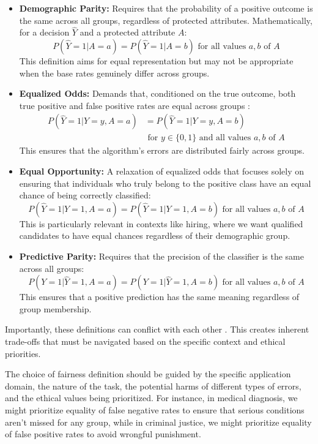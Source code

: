 \documentclass[12pt,a4paper,openright,twoside]{book}
\begin{document}
\begin{itemize}
    \item \textbf{Demographic Parity:} Requires that the probability of a positive outcome is the same across all groups, regardless of protected attributes. Mathematically, for a decision $\hat{Y}$ and a protected attribute $A$:
    \[ P(\hat{Y} = 1 | A = a) = P(\hat{Y} = 1 | A = b) \text{ for all values } a, b \text{ of } A \]
    This definition aims for equal representation but may not be appropriate when the base rates genuinely differ across groups.
    
    \item \textbf{Equalized Odds:} Demands that, conditioned on the true outcome, both true positive and false positive rates are equal across groups \cite{hardt2016equalityopportunitysupervisedlearning}:
    \[ \begin{aligned}
    P(\hat{Y} = 1 | Y = y, A = a) &= P(\hat{Y} = 1 | Y = y, A = b) \\
    &\text{ for } y \in \{0, 1\} \text{ and all values } a, b \text{ of } A
    \end{aligned} \]
    This ensures that the algorithm's errors are distributed fairly across groups.
    
    \item \textbf{Equal Opportunity:} A relaxation of equalized odds that focuses solely on ensuring that individuals who truly belong to the positive class have an equal chance of being correctly classified:
    \[ P(\hat{Y} = 1 | Y = 1, A = a) = P(\hat{Y} = 1 | Y = 1, A = b) \text{ for all values } a, b \text{ of } A \]
    This is particularly relevant in contexts like hiring, where we want qualified candidates to have equal chances regardless of their demographic group.
    
    \item \textbf{Predictive Parity:} Requires that the precision of the classifier is the same across all groups:
    \[ P(Y = 1 | \hat{Y} = 1, A = a) = P(Y = 1 | \hat{Y} = 1, A = b) \text{ for all values } a, b \text{ of } A \]
    This ensures that a positive prediction has the same meaning regardless of group membership.
\end{itemize}

Importantly, these definitions can conflict with each other \cite{kusner2017counterfactual}. This creates inherent trade-offs that must be navigated based on the specific context and ethical priorities.

The choice of fairness definition should be guided by the specific application domain, the nature of the task, the potential harms of different types of errors, and the ethical values being prioritized. For instance, in medical diagnosis, we might prioritize equality of false negative rates to ensure that serious conditions aren't missed for any group, while in criminal justice, we might prioritize equality of false positive rates to avoid wrongful punishment.
\end{document}
